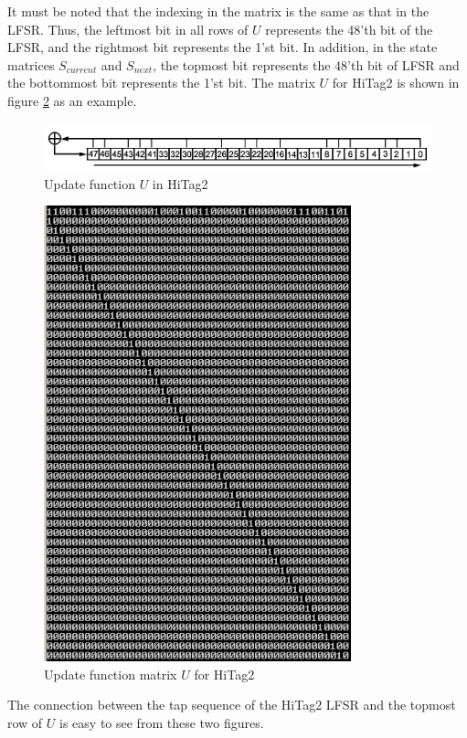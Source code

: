 It must be noted that the indexing in the matrix is the same as that in the LFSR. Thus, the leftmost bit in all rows of $U$ represents the 48'th bit of the LFSR, and the rightmost bit represents the 1'st bit. In addition, in the state matrices $S_{current}$ and $S_{next}$, the topmost bit represents the 48'th bit of LFSR and the bottommost bit represents the 1'st bit. The matrix $U$ for HiTag2 is shown in figure \ref{fig:hitag2-transition-matrix} as an example. 

\begin{figure}[h!]
	\centering
	\includegraphics[width=5in]{./figures/hitag2-update-function.png}
	\caption{Update function $U$ in HiTag2}	
	\label{fig:hitag2-update-function}
\end{figure}

\begin{figure}[h!]
	\centering
	\includegraphics[width=3.5in]{./figures/hitag2-transition-matrix.png}
	\caption{Update function matrix $U$ for HiTag2}	
	\label{fig:hitag2-transition-matrix}
\end{figure}

The connection between the tap sequence of the HiTag2 LFSR and the topmost row of $U$ is easy to see from these two figures. 

